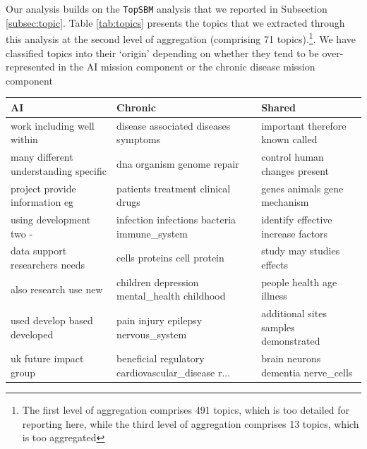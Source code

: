 \documentclass[11pt]{article}
\begin{document}
Our analysis builds on the \texttt{TopSBM} analysis that we reported in Subsection \ref{subsec:topic}. Table \ref{tab:topics} presents the topics that we extracted through this analysis at the second level of aggregation (comprising 71 topics).\footnote{The first level of aggregation comprises 491 topics, which is too detailed for reporting here, while the third level of aggregation comprises 13 topics, which is too aggregated}. We have classified topics into their `origin' depending on whether they tend to be over-represented in the AI mission component or the chronic disease mission component

\begin{landscape}
\begin{table}
\footnotesize
\begin{tabular}{lll}
\toprule
                                                AI &                                            Chronic &                                             Shared \\
\hline
\midrule
                        work including well within &               disease associated diseases symptoms &                   important therefore known called \\
             many different understanding specific &                         dna organism genome repair &                      control human changes present \\
                    project provide information eg &                  patients treatment clinical drugs &                       genes animals gene mechanism \\
                           using development two - &        infection infections bacteria immune\_system &                identify effective increase factors \\
                    data support researchers needs &                        cells proteins cell protein &                          study may studies effects \\
                             also research use new &        children depression mental\_health childhood &                          people health age illness \\
                      used develop based developed &                pain injury epilepsy nervous\_system &              additional sites samples demonstrated \\
                            uk future impact group &  beneficial regulatory cardiovascular\_disease r... &                 brain neurons dementia nerve\_cells \\

\end{tabular}
\end{table}
\end{landscape}
\end{document}
